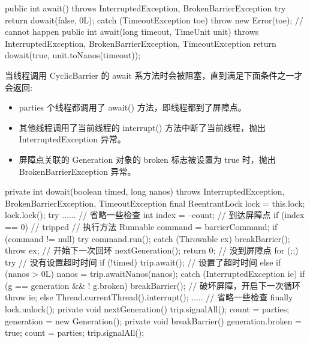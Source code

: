 \begin{Java}
public int await() throws InterruptedException, BrokenBarrierException {
    try {
        return dowait(false, 0L);
    } catch (TimeoutException toe) {
        throw new Error(toe); // cannot happen
    }
}
public int await(long timeout, TimeUnit unit) throws InterruptedException, BrokenBarrierException, TimeoutException {
    return dowait(true, unit.toNanos(timeout));
}
\end{Java}

当线程调用 CyclicBarrier 的 await 系方法时会被阻塞，直到满足下面条件之一才会返回:
\begin{itemize}
    \item parties 个线程都调用了 await() 方法，即线程都到了屏障点。
    \item 其他线程调用了当前线程的 interrupt() 方法中断了当前线程，抛出 InterruptedException 异常。
    \item 屏障点关联的 Generation 对象的 broken 标志被设置为 true 时，抛出 BrokenBarrierException 异常。
\end{itemize}

\begin{Java}
private int dowait(boolean timed, long nanos) throws InterruptedException, BrokenBarrierException, TimeoutException {
    final ReentrantLock lock = this.lock;
    lock.lock();
    try {
        ...... // 省略一些检查
        int index = --count;
        // 到达屏障点
        if (index == 0) {  // tripped
            // 执行方法
            Runnable command = barrierCommand;
            if (command != null) {
                try {
                    command.run();
                } catch (Throwable ex) {
                    breakBarrier();
                    throw ex;
                }
            }
            // 开始下一次回环
            nextGeneration();
            return 0;
        }
        // 没到屏障点
        for (;;) {
            try {
                // 没有设置超时时间
                if (!timed)
                    trip.await();
                // 设置了超时时间
                else if (nanos > 0L)
                    nanos = trip.awaitNanos(nanos);
            } catch (InterruptedException ie) {
                if (g == generation && ! g.broken) {
                    breakBarrier(); // 破坏屏障，开启下一次循环
                    throw ie;
                } else {
                    Thread.currentThread().interrupt();
                }
            }
            .....   // 省略一些检查
        }
    } finally {
        lock.unlock();
    }
}
private void nextGeneration() {
    trip.signalAll();
    count = parties;
    generation = new Generation();
}
private void breakBarrier() {
    generation.broken = true;
    count = parties;
    trip.signalAll();
}
\end{Java}


